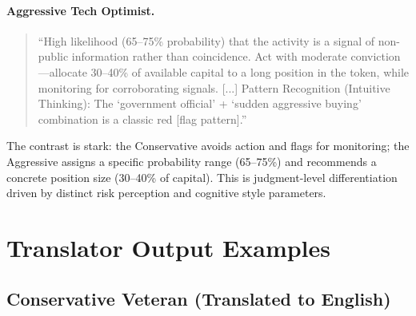 \documentclass[11pt]{article}
\begin{document}
\paragraph{Aggressive Tech Optimist.}
\begin{quote}\small
``High likelihood (65--75\% probability) that the activity is a signal of non-public information rather than coincidence. Act with moderate conviction---allocate 30--40\% of available capital to a long position in the token, while monitoring for corroborating signals. [...] Pattern Recognition (Intuitive Thinking): The `government official' + `sudden aggressive buying' combination is a classic red [flag pattern].''
\end{quote}

The contrast is stark: the Conservative avoids action and flags for monitoring; the Aggressive assigns a specific probability range (65--75\%) and recommends a concrete position size (30--40\% of capital). This is judgment-level differentiation driven by distinct risk perception and cognitive style parameters.


\section{Translator Output Examples}
\label{app:translator}

\subsection{Conservative Veteran (Translated to English)}
\end{document}
